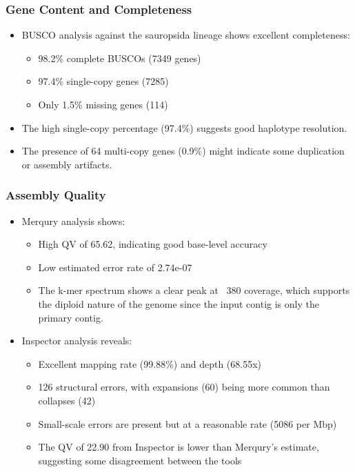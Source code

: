 \documentclass[12pt]{article}
\begin{document}
\subsubsection{Gene Content and Completeness}
\begin{itemize}
    \item BUSCO analysis against the sauropsida lineage shows excellent completeness:
    \begin{itemize}
        \item 98.2\% complete BUSCOs (7349 genes)
        \item 97.4\% single-copy genes (7285)
        \item Only 1.5\% missing genes (114)
    \end{itemize}
    \item The high single-copy percentage (97.4\%) suggests good haplotype resolution.
    \item The presence of 64 multi-copy genes (0.9\%) might indicate some duplication or assembly artifacts.
\end{itemize}

\subsubsection{Assembly Quality}
\begin{itemize}
    \item Merqury analysis shows:
    \begin{itemize}
        \item High QV of 65.62, indicating good base-level accuracy
        \item Low estimated error rate of 2.74e-07
        \item The k-mer spectrum shows a clear peak at ~380 coverage, which supports the diploid nature of the genome since the input contig is only the primary contig.
    \end{itemize}
    \item Inspector analysis reveals:
    \begin{itemize}
        \item Excellent mapping rate (99.88\%) and depth (68.55x)
        \item 126 structural errors, with expansions (60) being more common than collapses (42)
        \item Small-scale errors are present but at a reasonable rate (5086 per Mbp)
        \item The QV of 22.90 from Inspector is lower than Merqury's estimate, suggesting some disagreement between the tools
    \end{itemize}
\end{itemize}
\end{document}
